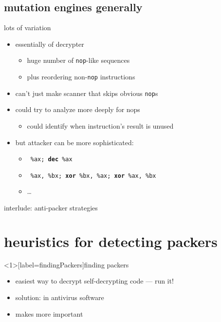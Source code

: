 \subsection{mutation engines generally}

\begin{frame}{lots of variation}
    \begin{itemize}
    \item essentially  of decrypter
        \begin{itemize}
        \item huge number of {\tt nop}-like sequences
        \item plus reordering non-{\tt nop} instructions
        \end{itemize}
    \item can't just make scanner that skips obvious {\tt nop}s
    \vspace{.5cm}
    \item<2-> could try to analyze more deeply for nops
        \begin{itemize}
        \item could identify when instruction's result is unused
        \end{itemize}
    \item<3-> but attacker can be more sophisticated:
        \begin{itemize}
        \item {\tt\fontsize{11}{12}\selectfont {\bfseries inc} \%ax; {\bfseries dec} \%ax}
        \item {\tt\fontsize{11}{12}\selectfont {\bfseries xor} \%ax, \%bx; {\bfseries xor} \%bx, \%ax; {\bfseries xor} \%ax, \%bx}
        \item \ldots
        \end{itemize}
    \end{itemize}
\end{frame}

\begin{frame}{interlude: anti-packer strategies}
\end{frame}

\section{heuristics for detecting packers}

\begin{frame}<1>[label=findingPackers]{finding packers}
    \begin{itemize}
    \item easiest way to decrypt self-decrypting code --- run it!
    \item solution:  in antivirus software
    \vspace{.5cm}
    \item makes  more important
    \end{itemize}
\end{frame}

